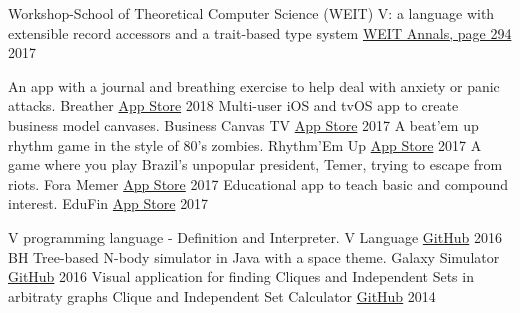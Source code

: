 

\begin{cventries}
  \cventry
    {Workshop-School of Theoretical Computer Science (WEIT)}
    {V: a language with extensible record accessors and a trait-based type system}
    {\href{http://weit2017.inf.ufsm.br/wp-content/uploads/2017/10/Versao_final.pdf}{WEIT Annals, page 294}}
    {2017}
    {
    }
\end{cventries}


\begin{cventries}
  \cvcompactentry
    {An app with a journal and breathing exercise to help deal with anxiety or panic attacks.}
    {Breather}
    {\href{https://itunes.apple.com/app/id1370659046?mt=8}{App Store}}
    {2018}
  \cvcompactentry
    {Multi-user iOS and tvOS app to create business model canvases.}
    {Business Canvas TV}
    {\href{https://itunes.apple.com/app/id1292335686?mt=8}{App Store}}
    {2017}
  \cvcompactentry
    {A beat'em up rhythm game in the style of 80's zombies.}
    {Rhythm'Em Up}
    {\href{https://itunes.apple.com/app/id1231577657?mt=8}{App Store}}
    {2017}
  \cvcompactentry
    {A game where you play Brazil's unpopular president, Temer, trying to escape from riots.}
    {Fora Memer}
    {\href{https://itunes.apple.com/br/app/fora-memer/id1253655537?l=en&mt=8}{App Store}}
    {2017}
  \cvcompactentry
    {Educational app to teach basic and compound interest.}
    {EduFin}
    {\href{https://itunes.apple.com/app/id1231577657?mt=8}{App Store}}
    {2017}
\end{cventries}


\begin{cventries}
  \cvcompactentry
    {V programming language - Definition and Interpreter.}
    {V Language}
    {\href{https://github.com/AvatarHurden/V}{GitHub}}
    {2016}
  \cvcompactentry
    {BH Tree-based N-body simulator in Java with a space theme.}
    {Galaxy Simulator}
    {\href{https://github.com/AvatarHurden/Simulador-Galaxias}{GitHub}}
    {2016}
  \cvcompactentry
    {Visual application for finding Cliques and Independent Sets in arbitraty graphs}
    {Clique and Independent Set Calculator}
    {\href{https://github.com/AvatarHurden/Clique-and-Ind.Set-Calculator}{GitHub}}
    {2014}
\end{cventries}

